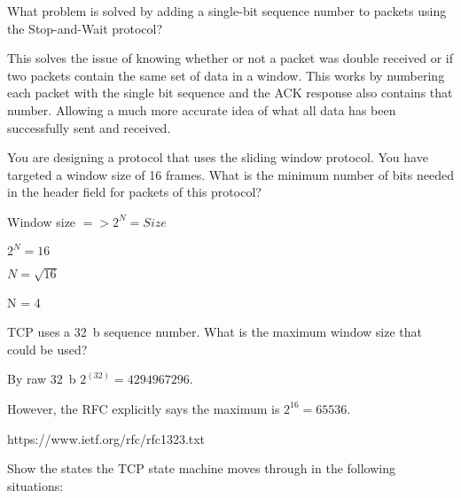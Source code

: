 \documentclass[12pt,addpoints,answers]{exam}
\begin{document}
\begin{questions}
\question[2] What problem is solved by adding a single-bit sequence number to packets using the Stop-and-Wait protocol?
\begin{solution}
	This solves the issue of knowing whether or not a packet was double received or if two packets contain the same set of data in a window.  This works by numbering each packet with the single bit sequence and the ACK response also contains that number.  Allowing a much more accurate idea of what all data has been successfully sent and received.
\end{solution}

\question[5] You are designing a protocol that uses the sliding window protocol. You have targeted a window size of 16 frames. What is the minimum number of bits needed in the header field for packets of this protocol?
\begin{solution}
	Window size $=> 2^N = Size$
	
	$2^N = 16$
	
	$N = \sqrt{16}$
	
	N = 4
\end{solution}

\question[3] TCP uses a \SI{32}{b} sequence number. What is the maximum window size that could be used?
\begin{solution}
	By raw \SI{32}{b}
	$2 ^ (32) = 4294967296$.
	
	However, the RFC explicitly says the maximum is $2^16 = 65536$.
	
	https://www.ietf.org/rfc/rfc1323.txt
\end{solution}

\question[12] Show the states the TCP state machine moves through in the following situations:
\end{questions}
\end{document}
